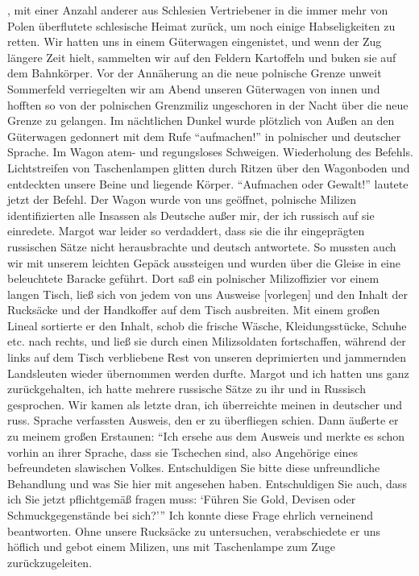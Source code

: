 {}, mit einer Anzahl anderer aus Schlesien Vertriebener in die immer mehr von Polen überflutete schlesische Heimat zurück, um noch einige Habseligkeiten zu retten. Wir hatten uns in einem Güterwagen eingenistet, und wenn der Zug längere Zeit hielt, sammelten wir auf den Feldern Kartoffeln und buken sie auf dem Bahnkörper. Vor der Annäherung an die neue polnische Grenze unweit Sommerfeld verriegelten wir  am Abend unseren Güterwagen von innen und hofften so von der polnischen Grenzmiliz ungeschoren in der Nacht über die neue Grenze zu gelangen. Im nächtlichen Dunkel wurde plötzlich von Außen an den Güterwagen gedonnert mit dem Rufe \enquote{aufmachen!} in polnischer und deutscher Sprache. Im Wagon atem- und regungsloses Schweigen. Wiederholung des Befehls. Lichtstreifen von Taschenlampen glitten durch Ritzen über den Wagonboden und entdeckten unsere Beine und liegende Körper. \enquote{Aufmachen oder Gewalt!} lautete jetzt der Befehl. Der Wagon wurde von uns geöffnet, polnische Milizen identifizierten alle Insassen als Deutsche außer mir, der ich russisch auf sie einredete. Margot war leider so verdaddert, dass sie die ihr eingeprägten russischen Sätze nicht herausbrachte und deutsch antwortete. So mussten auch wir mit unserem leichten Gepäck aussteigen und wurden über die Gleise in eine beleuchtete Baracke geführt. Dort saß ein polnischer Milizoffizier vor einem langen Tisch, ließ sich von jedem von uns Ausweise [vorlegen] und den Inhalt der Rucksäcke und der Handkoffer auf dem Tisch ausbreiten. Mit einem großen Lineal sortierte er den Inhalt, schob die frische Wäsche, Kleidungsstücke, Schuhe etc. nach rechts, und ließ sie durch einen Milizsoldaten fortschaffen,  während der links auf dem Tisch verbliebene Rest von unseren deprimierten und jammernden Landsleuten wieder übernommen werden durfte. Margot und ich hatten uns ganz zurückgehalten, ich hatte mehrere russische Sätze zu ihr und in Russisch gesprochen. Wir kamen als letzte dran, ich überreichte meinen in deutscher und russ. Sprache verfassten Ausweis, den er zu überfliegen schien. Dann äußerte er zu meinem großen Erstaunen: \enquote{Ich ersehe aus dem Ausweis und merkte es schon vorhin an ihrer Sprache, dass sie Tschechen sind, also Angehörige eines befreundeten slawischen Volkes. Entschuldigen Sie bitte diese unfreundliche Behandlung und was Sie hier mit angesehen haben. Entschuldigen Sie auch, dass ich Sie jetzt pflichtgemäß fragen muss: \enquote{Führen Sie Gold, Devisen oder Schmuckgegenstände bei sich?}} Ich konnte diese Frage ehrlich verneinend beantworten. Ohne unsere Rucksäcke zu untersuchen, verabschiedete er uns höflich und gebot einem Milizen, uns mit Taschenlampe zum Zuge zurückzugeleiten.

